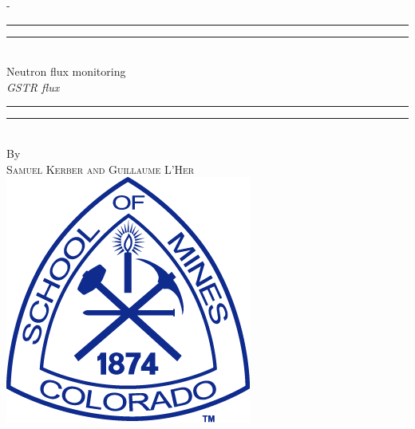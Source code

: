 %
%
% 
%
%
\begin{titlingpage}
\begin{SingleSpace}
\calccentering{\unitlength} 
\begin{adjustwidth*}{\unitlength}{-\unitlength}
\vspace*{13mm}
\begin{center}
\rule[0.5ex]{\linewidth}{2pt}\vspace*{-\baselineskip}\vspace*{3.2pt}
\rule[0.5ex]{\linewidth}{1pt}\\[\baselineskip]
{\HUGE Neutron flux monitoring }\\[4mm]
{\Large \textit{GSTR flux}}\\
\rule[0.5ex]{\linewidth}{1pt}\vspace*{-\baselineskip}\vspace{3.2pt}
\rule[0.5ex]{\linewidth}{2pt}\\
\vspace{6.5mm}
{\large By}\\
\vspace{6.5mm}
{\large\textsc{Samuel Kerber and Guillaume L'Her}}\\
\vspace{11mm}
\includegraphics[scale=0.6]{logos/CSM}\\

\end{center}
\end{adjustwidth*}
\end{SingleSpace}
\end{titlingpage}
